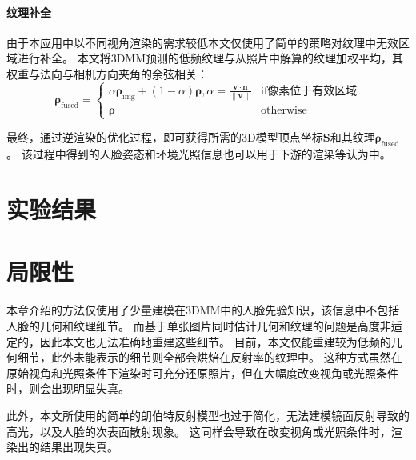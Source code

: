 \paragraph{纹理补全}
由于本应用中以不同视角渲染的需求较低本文仅使用了简单的策略对纹理中无效区域进行补全。
本文将3DMM预测的低频纹理与从照片中解算的纹理加权平均，其权重与法向与相机方向夹角的余弦相关：
\begin{equation}
\mathbf{\rho}_\mathrm{fused} = \begin{cases}
    \alpha \mathbf{\rho}_\mathrm{img} + (1-\alpha) \mathbf{\rho}, \alpha = \frac{\mathbf{v}\cdot\mathbf{n}}{\|\mathbf{v}\|} & \text{if像素位于有效区域} \\
\mathbf{\rho} & \text{otherwise}
\end{cases}
\label{eq:texture_fusion}
\end{equation}

最终，通过逆渲染的优化过程，即可获得所需的3D模型顶点坐标$\mathbf{S}$和其纹理$\mathbf{\rho}_\mathrm{fused}$。
该过程中得到的人脸姿态和环境光照信息也可以用于下游的渲染等认为中。

\section{实验结果}

\section{局限性}

本章介绍的方法仅使用了少量建模在3DMM中的人脸先验知识，该信息中不包括人脸的几何和纹理细节。
而基于单张图片同时估计几何和纹理的问题是高度非适定的，因此本文也无法准确地重建这些细节。
目前，本文仅能重建较为低频的几何细节，此外未能表示的细节则全部会烘焙在反射率的纹理中。
这种方式虽然在原始视角和光照条件下渲染时可充分还原照片，但在大幅度改变视角或光照条件时，则会出现明显失真。

此外，本文所使用的简单的朗伯特反射模型也过于简化，无法建模镜面反射导致的高光，以及人脸的次表面散射现象。
这同样会导致在改变视角或光照条件时，渲染出的结果出现失真。
